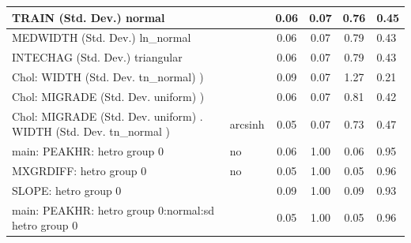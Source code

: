 \begin{table}
\begin{center}
\begin{tabular}{|l|l|c|c|c|l|}
			\hline
			TRAIN (Std. Dev.) normal &  & 0.06 & 0.07 & 0.76 & 0.45 \\
			\hline
			MEDWIDTH (Std. Dev.) ln_normal &  & 0.06 & 0.07 & 0.79 & 0.43 \\
			\hline
			INTECHAG (Std. Dev.) triangular &  & 0.06 & 0.07 & 0.79 & 0.43 \\
			\hline
			 Chol: WIDTH (Std. Dev. tn_normal) ) &  & 0.09 & 0.07 & 1.27 & 0.21 \\
			\hline
			 Chol: MIGRADE (Std. Dev. uniform) ) &  & 0.06 & 0.07 & 0.81 & 0.42 \\
			\hline
			 Chol: MIGRADE (Std. Dev. uniform) . WIDTH (Std. Dev.   tn_normal ) & arcsinh & 0.05 & 0.07 & 0.73 & 0.47 \\
			\hline
			main: PEAKHR: hetro group 0 & no & 0.06 & 1.00 & 0.06 & 0.95 \\
			\hline
			MXGRDIFF: hetro group 0 & no & 0.05 & 1.00 & 0.05 & 0.96 \\
			\hline
			SLOPE: hetro group 0 &  & 0.09 & 1.00 & 0.09 & 0.93 \\
			\hline
			main: PEAKHR: hetro group 0:normal:sd  hetro group 0 &  & 0.05 & 1.00 & 0.05 & 0.96 \\
			\hline
		\end{tabular}
	\end{center}
\end{table}